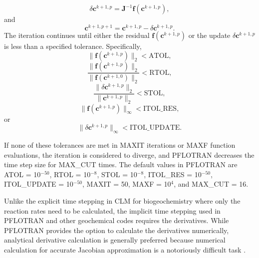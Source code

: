 \documentclass[gmd, manuscript]{copernicus}
\begin{document}
\begin{equation}
\delta \mathbf{c}^{k+1,p}= \mathbf{J}^{-1} \mathbf{f} (\mathbf{c}^{k+1,p}),
\label{eq:axb}
\end{equation}
and
\begin{equation}
\mathbf{c}^{k+1,p+1}=\mathbf{c}^{k+1,p}-\delta \mathbf{c}^{k+1,p}.
\label{eq:update}
\end{equation}
The iteration continues until either the residual
$\mathbf{f}(\mathbf{c}^{k+1,p} )$ or the update $\delta
\mathbf{c}^{k+1,p}$ is less than a specified tolerance. Specifically,
\begin{equation}
\|\mathbf{f}(\mathbf{c}^{k+1,p} )\|_2 < \text{ATOL},
\label{eq:atol}
\end{equation}
\begin{equation}
\frac{\|\mathbf{f}(\mathbf{c}^{k+1,p} )\|_2}{\|\mathbf{f}(\mathbf{c}^{k+1,0} )\|_2} < \text{RTOL},
\label{eq:rtol}
\end{equation}
\begin{equation}
\frac{\|\delta \mathbf{c}^{k+1,p} \|_2}{\|\mathbf{c}^{k+1,p} \|_2} < \text{STOL},
\label{eq:stol}
\end{equation}
\begin{equation}
\|\mathbf{f}(\mathbf{c}^{k+1,p} )\|_\infty < \text{ITOL\_RES},
\label{eq:itol}
\end{equation}
or
\begin{equation}
\|\delta \mathbf{c}^{k+1,p} \|_\infty  <  \text{ITOL\_UPDATE}.
\end{equation}

If none of these tolerances are met in MAXIT iterations or MAXF function
evaluations, the iteration is considered to diverge, and PFLOTRAN decreases the
time step size for MAX\_CUT times. The default values in PFLOTRAN are ATOL =
10$^{-50}$, RTOL = 10$^{-8}$, STOL = 10$^{-8}$,  ITOL\_RES = 10$^{-50}$,
ITOL\_UPDATE = 10$^{-50}$, MAXIT = 50, MAXF = 10$^4$, and MAX\_CUT = 16.

Unlike the explicit time stepping in CLM for biogeochemistry where only the
reaction rates need to be calculated, the implicit time stepping used in
PFLOTRAN and other geochemical codes requires the derivatives.  While PFLOTRAN
provides the option to calculate the derivatives numerically, 
analytical derivative calculation is generally preferred \citep[e.g.,][]{Xu2006}
because numerical calculation for accurate Jacobian approximation is a
notoriously difficult task \citep{Shampine2005}. 
\end{document}
